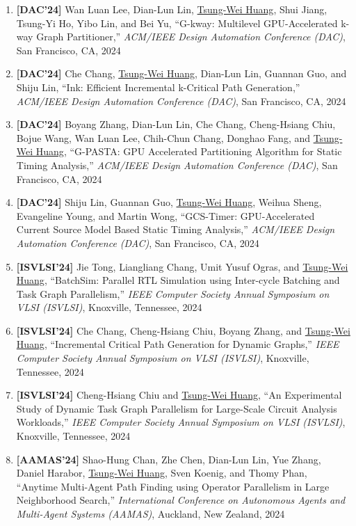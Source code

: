 \documentclass[A4,11pt]{article}
\begin{document}
\begin{enumerate}
    \item \textbf{[DAC'24]} Wan Luan Lee, Dian-Lun Lin, \underline{Tsung-Wei Huang}, Shui Jiang, Tsung-Yi Ho, Yibo Lin, and Bei Yu, ``G-kway: Multilevel GPU-Accelerated k-way Graph Partitioner,'' \textit{ACM/IEEE Design Automation Conference (DAC)}, San Francisco, CA, 2024

    \item \textbf{[DAC'24]} Che Chang, \underline{Tsung-Wei Huang}, Dian-Lun Lin, Guannan Guo, and Shiju Lin, ``Ink: Efficient Incremental k-Critical Path Generation,'' \textit{ACM/IEEE Design Automation Conference (DAC)}, San Francisco, CA, 2024

    \item \textbf{[DAC'24]} Boyang Zhang, Dian-Lun Lin, Che Chang, Cheng-Hsiang Chiu, Bojue Wang, Wan Luan Lee, Chih-Chun Chang, Donghao Fang, and \underline{Tsung-Wei Huang}, ``G-PASTA: GPU Accelerated Partitioning Algorithm for Static Timing Analysis,'' \textit{ACM/IEEE Design Automation Conference (DAC)}, San Francisco, CA, 2024

    \item \textbf{[DAC'24]} Shiju Lin, Guannan Guo, \underline{Tsung-Wei Huang}, Weihua Sheng, Evangeline Young, and Martin Wong, ``GCS-Timer: GPU-Accelerated Current Source Model Based Static Timing Analysis,'' \textit{ACM/IEEE Design Automation Conference (DAC)}, San Francisco, CA, 2024

    \item \textbf{[ISVLSI'24]} Jie Tong, Liangliang Chang, Umit Yusuf Ogras, and \underline{Tsung-Wei Huang}, ``BatchSim: Parallel RTL Simulation using Inter-cycle Batching and Task Graph Parallelism,'' \textit{IEEE Computer Society Annual Symposium on VLSI (ISVLSI)}, Knoxville, Tennessee, 2024

    \item \textbf{[ISVLSI'24]} Che Chang, Cheng-Hsiang Chiu, Boyang Zhang, and \underline{Tsung-Wei Huang}, ``Incremental Critical Path Generation for Dynamic Graphs,'' \textit{IEEE Computer Society Annual Symposium on VLSI (ISVLSI)}, Knoxville, Tennessee, 2024

    \item \textbf{[ISVLSI'24]} Cheng-Hsiang Chiu and \underline{Tsung-Wei Huang}, ``An Experimental Study of Dynamic Task Graph Parallelism for Large-Scale Circuit Analysis Workloads,'' \textit{IEEE Computer Society Annual Symposium on VLSI (ISVLSI)}, Knoxville, Tennessee, 2024

    \item \textbf{[AAMAS'24]} Shao-Hung Chan, Zhe Chen, Dian-Lun Lin, Yue Zhang, Daniel Harabor, \underline{Tsung-Wei Huang}, Sven Koenig, and Thomy Phan, ``Anytime Multi-Agent Path Finding using Operator Parallelism in Large Neighborhood Search,'' \textit{International Conference on Autonomous Agents and Multi-Agent Systems (AAMAS)}, Auckland, New Zealand, 2024


\end{enumerate}
\end{document}
